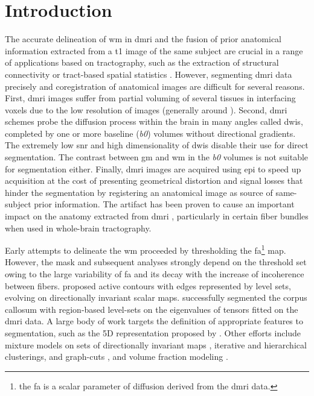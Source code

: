 \section{Introduction}\label{sec:introduction}
The accurate delineation of \gls*{wm} in \gls*{dmri} and the fusion of prior
  anatomical information extracted from a \gls*{t1} image of the same subject
  are crucial in a range of applications based on tractography, such as
  the extraction of structural connectivity \citep{craddock_imaging_2013} or
  tract-based spatial statistics \citep{smith_tractbased_2006}.
However, segmenting \gls*{dmri} data precisely and coregistration of anatomical
  images are difficult for several reasons.
First, \gls{dmri} images suffer from partial voluming of several tissues in 
  interfacing voxels due to the low resolution of images (generally around
  ).
Second, \gls*{dmri} schemes probe the diffusion process within the brain in 
  many angles called \glspl*{dwi}, completed by one or more baseline (\emph{b0}) 
  volumes without directional gradients.
The extremely low \gls*{snr} and high dimensionality of \glspl*{dwi} disable their
  use for direct segmentation.
The contrast between \gls*{gm} and \gls*{wm} in the \emph{b0} volumes is not suitable for 
  segmentation either.
Finally, \gls*{dmri} images are acquired using \gls*{epi} to speed up acquisition
  at the cost of presenting geometrical distortion and 
  signal losses \citep{jezzard_correction_1995} that hinder the segmentation by
  registering an anatomical image as source of same-subject prior information.
The artifact has been proven to cause an important impact on the anatomy extracted
  from \gls*{dmri} \citep{irfanoglu_effects_2012}, particularly in certain fiber bundles
  when used in whole-brain tractography.

Early attempts to delineate the \gls*{wm} proceeded by thresholding the 
  \gls*{fa}\footnote{the \gls*{fa} is a scalar parameter of diffusion derived from
  the \gls*{dmri} data.} map.
However, the mask and subsequent analyses strongly depend on the threshold set
  \citep{taoka_fractional_2009} owing to the large variability of \gls*{fa} and its
  decay with the increase of incoherence between fibers.
\cite{zhukov_level_2003} proposed active contours with edges represented
  by level sets, evolving on directionally invariant scalar maps.
\cite{rousson_level_2004} successfully segmented the corpus callosum with
  region-based level-sets on the eigenvalues of tensors fitted on the
  \gls*{dmri} data.
A large body of work targets the definition of appropriate features to segmentation,
  such as the 5D representation proposed by \cite{jonasson_segmentation_2005}.
Other efforts include mixture models on sets of directionally invariant maps
  \citep{liu_brain_2007}, iterative \citep{hadjiprocopis_unbiased_2005} and
  hierarchical \citep{lu_segmentation_2008} clusterings,
  and graph-cuts \citep{han_experimental_2009},
  and volume fraction modeling \citep{kumazawa_improvement_2013}.
 
